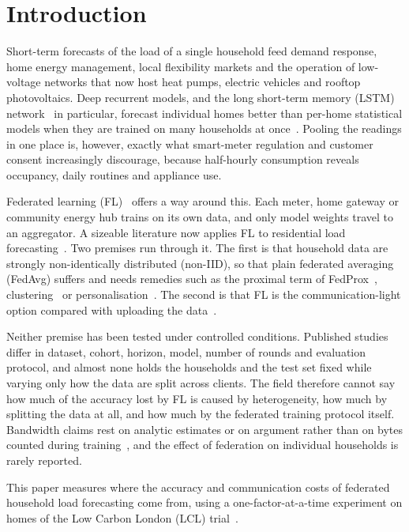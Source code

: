 \section{Introduction}

Short-term forecasts of the load of a single household feed demand response, home energy management, local
flexibility markets and the operation of low-voltage networks that now host heat pumps, electric vehicles and rooftop
photovoltaics. Deep recurrent models, and the long short-term memory (LSTM) network~\cite{hochreiter1997lstm} in
particular, forecast individual homes better than per-home statistical models when they are trained on many households
at once~\cite{kong2019stlf,shi2018pdrnn}. Pooling the readings in one place is, however, exactly what smart-meter
regulation and customer consent increasingly discourage, because half-hourly consumption reveals occupancy, daily
routines and appliance use.

Federated learning (FL)~\cite{mcmahan2017fedavg,kairouz2021advances} offers a way around this. Each meter, home gateway
or community energy hub trains on its own data, and only model weights travel to an aggregator. A sizeable literature
now applies FL to residential load forecasting~\cite{fernndez2022,fekri2022,gholizadeh2022,widmer2023,qu2023,liu2023,das2026}.
Two premises run through it. The first is that household data are strongly non-identically distributed (non-IID), so
that plain federated averaging (FedAvg) suffers and needs remedies such as the proximal term of
FedProx~\cite{li2020fedprox}, clustering~\cite{gholizadeh2022,dogra2023} or personalisation~\cite{qu2023,widmer2023}.
The second is that FL is the communication-light option compared with uploading the data~\cite{taik2020,savi2021}.

Neither premise has been tested under controlled conditions. Published studies differ in dataset, cohort, horizon,
model, number of rounds and evaluation protocol, and almost none holds the households and the test set fixed while
varying only how the data are split across clients. The field therefore cannot say how much of the accuracy lost by
FL is caused by heterogeneity, how much by splitting the data at all, and how much by the federated training protocol
itself. Bandwidth claims rest on analytic estimates or on argument rather than on bytes counted during
training~\cite{taik2020,briggs2020ccai}, and the effect of federation on individual households is rarely reported.

This paper measures where the accuracy and communication costs of federated household load forecasting come from,
using a one-factor-at-a-time experiment on \NumHouseholds{} homes of the Low Carbon London (LCL)
trial~\cite{ukpn2015lcl}.

